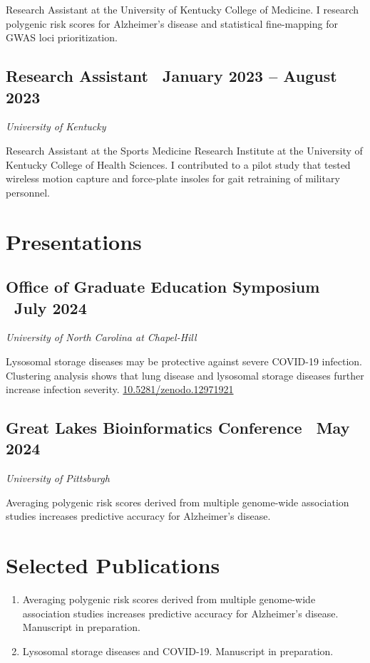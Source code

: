 \documentclass{article}
\begin{document}
\begin{flushleft}
Research Assistant at the University of Kentucky College of Medicine. I research polygenic risk scores for 
Alzheimer's disease and statistical fine-mapping for GWAS loci prioritization.

\subsection*{Research Assistant {\hfill\normalsize\normalfont\ January 2023 -- August 2023}}
\textit{University of Kentucky \vspace{0.5em}}

Research Assistant at the Sports Medicine Research Institute at the University of Kentucky College of Health Sciences. 
I contributed to a pilot study that tested wireless motion capture and force-plate insoles for gait retraining of military
personnel. 

\section*{Presentations}
\subsection*{Office of Graduate Education Symposium {\hfill\normalsize\normalfont\ July 2024}}
\textit{University of North Carolina at Chapel-Hill}

Lysosomal storage diseases may be protective against severe COVID-19 infection. Clustering analysis shows that lung disease and lysosomal storage diseases further increase 
infection severity. \href{https://doi.org/10.5281/zenodo.12971921}{10.5281/zenodo.12971921}

\subsection*{Great Lakes Bioinformatics Conference {\hfill\normalsize\normalfont\ May 2024}}
\textit{University of Pittsburgh \vspace{0.5em}}

Averaging polygenic risk scores derived from multiple genome-wide association studies increases predictive accuracy for Alzheimer’s disease.

\section*{Selected Publications}
\begin{enumerate}
\item Averaging polygenic risk scores derived from multiple genome-wide association studies increases predictive accuracy for Alzheimer’s disease. Manuscript in preparation.
\item Lysosomal storage diseases and COVID-19. Manuscript in preparation.
\end{enumerate}


\end{flushleft}
\end{document}
